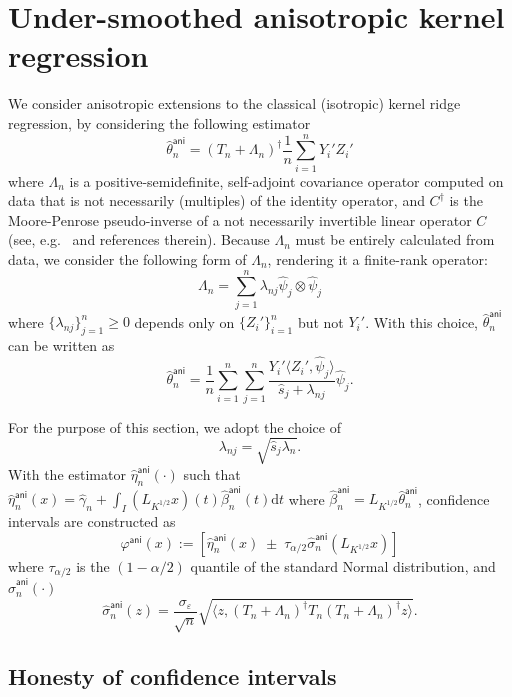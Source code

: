 \documentclass[11pt,a4paper]{article}
\renewcommand{\hat}{\widehat}
\theoremstyle{definition}
\theoremstyle{plain}
\theoremstyle{remark}
\newcommand{\ud}{\mathrm d}
\newcommand{\ani}{\mathsf{ani}}
\begin{document}
\section{Under-smoothed anisotropic kernel regression}\label{sec:anikrr}

We consider anisotropic extensions to the classical (isotropic) kernel ridge regression, by considering the following estimator
$$
\hat\theta_n^\ani = (T_n+\Lambda_n)^{\dagger}\frac{1}{n}\sum_{i=1}^n Y_i' Z_i'
$$
where $\Lambda_n$ is a positive-semidefinite, self-adjoint covariance operator computed on data that is not necessarily (multiples) of the identity operator,
and $C^\dagger$ is the Moore-Penrose pseudo-inverse of a not necessarily invertible linear operator $C$ (see, e.g.~\citep{fongi2023moore} and references therein).
Because $\Lambda_n$ must be entirely calculated from data, we consider the following form of $\Lambda_n$, rendering it a finite-rank operator:
$$
\Lambda_n = \sum_{j=1}^n \lambda_{nj}\hat\psi_j\otimes\hat\psi_j
$$
where $\{\lambda_{nj}\}_{j=1}^n\geq 0$ depends only on $\{Z_i'\}_{i=1}^n$ but not $Y_i'$.
With this choice, $\hat\theta_n^\ani$ can be written as
$$
\hat\theta_n^\ani = \frac{1}{n}\sum_{i=1}^n\sum_{j=1}^n \frac{Y_i'\langle Z_i',\hat\psi_j\rangle}{\hat s_j+\lambda_{nj}}\hat\psi_j.
$$

For the purpose of this section, we adopt the choice of 
$$
\lambda_{nj} =  \sqrt{\hat s_j\lambda_n}.
$$
With the estimator $\hat\eta^\ani_n(\cdot)$ such that $\hat\eta^\ani_n(x)=\hat\gamma_n+\int_I (L_{K^{1/2}}x)(t)\hat\beta^\ani_n(t)\ud t$  where $\hat\beta_n^\ani=L_{K^{1/2}}\hat\theta_n^\ani$, confidence intervals are constructed as
$$
\varphi^\ani(x) := [\hat\eta^\ani_n(x)\;\pm\;\tau_{\alpha/2}\hat\sigma_n^\ani(L_{K^{1/2}}x)]
$$
where $\tau_{\alpha/2}$ is the $(1-\alpha/2)$ quantile of the standard Normal distribution, and $\hat\sigma_n^\ani(\cdot)$ 
$$
\hat\sigma_n^\ani(z) = \frac{\sigma_\varepsilon}{\sqrt{n}}\sqrt{\langle z, (T_n+\Lambda_n)^{\dagger}T_n(T_n+\Lambda_n)^\dagger z\rangle}.
$$

\subsection{Honesty of confidence intervals}
\end{document}

